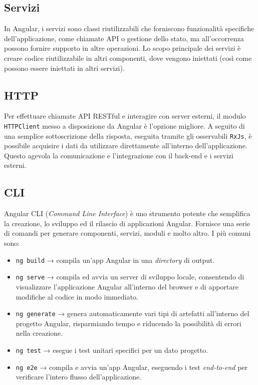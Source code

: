 \subsection{Servizi}
In Angular, i servizi sono classi riutilizzabili che forniscono funzionalità specifiche dell’applicazione, come chiamate API o gestione dello stato, ma all’occorrenza possono fornire supporto in altre operazioni.
Lo scopo principale dei servizi è creare codice riutilizzabile in altri componenti, dove vengono iniettati (così come possono essere iniettati in altri servizi).

\subsection{HTTP}

Per effettuare chiamate API RESTful e interagire con server esterni, il modulo\\\texttt{HTTPClient} messo a disposizione da Angular è l’opzione migliore. A seguito di una semplice sottoscrizione della risposta, eseguita tramite gli osservabili \texttt{RxJs}, è possibile acquisire i dati da utilizzare direttamente all’interno dell’applicazione. Questo agevola la comunicazione e l’integrazione con il back-end e i servizi esterni.\cite{ANGULAR_angular4}

\subsection{CLI}

Angular CLI (\textit{Command Line Interface}) è uno strumento potente che semplifica la creazione, lo sviluppo ed il rilascio di applicazioni Angular. Fornisce una serie di comandi per generare componenti, servizi, moduli e molto altro. I più comuni sono:
\begin{itemize}
    \item \texttt{ng build} → compila un’app Angular in una \textit{directory} di output.
    \item \texttt{ng serve} → compila ed avvia un server di sviluppo locale, consentendo di visualizzare l'applicazione Angular all'interno del browser e di apportare modifiche al codice in modo immediato.
    \item \texttt{ng generate} → genera automaticamente vari tipi di artefatti all’interno del progetto Angular, risparmiando tempo e riducendo la possibilità di errori nella creazione.
    \item \texttt{ng test} → esegue i test unitari specifici per un dato progetto.
    \item \texttt{ng e2e} → compila e avvia un’app Angular, eseguendo i test \textit{end-to-end} per verificare l'intero flusso dell'applicazione.\cite{ANGULAR_angular5}
\end{itemize}

